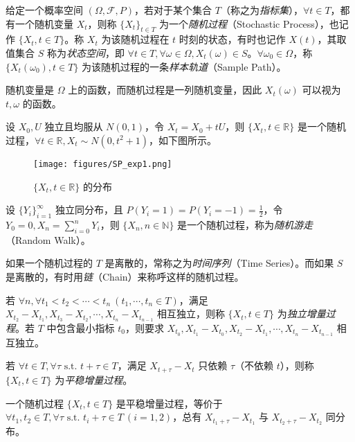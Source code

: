 \documentclass[../main.tex]{subfiles}
\begin{document}
\begin{definition*}
    给定一个概率空间 $(\Omega,\mathcal F,P)$，若对于某个集合 $T$（称之为\emph{指标集}），$\forall t\in T$，都有一个随机变量 $X_t$，则称 $\{X_t\}_{t\in T}$ 为一个\emph{随机过程}（Stochastic Process），也记作 $\{X_t,t\in T\}$。称 $X_t$ 为该随机过程在 $t$ 时刻的状态，有时也记作 $X(t)$，其取值集合 $S$ 称为\emph{状态空间}，即 $\forall t\in T,\forall \omega\in\Omega,X_t(\omega)\in S$。$\forall\omega_0\in\Omega$，称 $\{X_t(\omega_0),t\in T\}$ 为该随机过程的一条\emph{样本轨道}（Sample Path）。
\end{definition*}

随机变量是 $\Omega$ 上的函数，而随机过程是一列随机变量，因此 $X_t(\omega)$ 可以视为 $t,\omega$ 的函数。

\begin{example*}
    设 $X_0,U$ 独立且均服从 $N(0,1)$，令 $X_t=X_0+tU$，则 $\{X_t,t\in\mathbb R\}$ 是一个随机过程，$\forall t\in\mathbb R,X_t\sim N(0,t^2+1)$，如下图所示。
\end{example*}

\begin{figure}[!h]
    \centering
    \texttt{[image: figures/SP\_exp1.png]}
    \caption*{$\{X_t,t\in\mathbb R\}$ 的分布}
\end{figure}

\begin{example*}
    设 $\{Y_i\}_{i=1}^\infty$ 独立同分布，且 $P(Y_i=1)=P(Y_i=-1)=\frac12$，令 $Y_0=0,X_n=\sum_{i=0}^nY_i$，则 $\{X_n,n\in\mathbb N\}$ 是一个随机过程，称为\emph{随机游走}（Random Walk）。
\end{example*}

如果一个随机过程的 $T$ 是离散的，常称之为\emph{时间序列}（Time Series）。而如果 $S$ 是离散的，有时用\emph{链}（Chain）来称呼这样的随机过程。

\begin{definition*}
    若 $\forall n,\forall t_1<t_2<\cdots<t_n\ (t_1,\cdots,t_n\in T)$，满足 $X_{t_2}-X_{t_1},X_{t_3}-X_{t_2},\cdots,X_{t_n}-X_{t_{n-1}}$ 相互独立，则称 $\{X_t,t\in T\}$ 为\emph{独立增量过程}。若 $T$ 中包含最小指标 $t_0$，则要求 $X_{t_0},X_{t_1}-X_{t_0},X_{t_2}-X_{t_1},\cdots,X_{t_n}-X_{t_{n-1}}$ 相互独立。
\end{definition*}

\begin{definition*}
    若 $\forall t\in T,\forall\tau\text{ s.t. }t+\tau\in T$，满足 $X_{t+\tau}-X_t$ 只依赖 $\tau$（不依赖 $t$），则称 $\{X_t,t\in T\}$ 为\emph{平稳增量过程}。
\end{definition*}

一个随机过程 $\{X_t,t\in T\}$ 是平稳增量过程，等价于 $\forall t_1,t_2\in T,\forall\tau\text{ s.t. }t_i+\tau\in T\ (i=1,2)$，总有 $X_{t_1+\tau}-X_{t_1}$ 与 $X_{t_2+\tau}-X_{t_2}$ 同分布。
\end{document}
